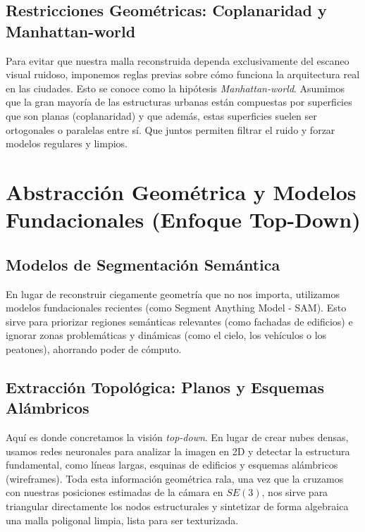 
\subsection{Restricciones Geométricas: Coplanaridad y Manhattan-world}
Para evitar que nuestra malla reconstruida dependa exclusivamente del escaneo visual ruidoso, imponemos reglas previas sobre cómo funciona la arquitectura real en las ciudades. Esto se conoce como la hipótesis \textit{Manhattan-world}. Asumimos que la gran mayoría de las estructuras urbanas están compuestas por superficies que son planas (coplanaridad) y que además, estas superficies suelen ser ortogonales o paralelas entre sí. Que juntos permiten filtrar el ruido y forzar modelos regulares y limpios.


\section{Abstracción Geométrica y Modelos Fundacionales (Enfoque Top-Down)}

\subsection{Modelos de Segmentación Semántica}
En lugar de reconstruir ciegamente geometría que no nos importa, utilizamos modelos fundacionales recientes (como Segment Anything Model - SAM). Esto sirve para priorizar regiones semánticas relevantes (como fachadas de edificios) e ignorar zonas problemáticas y dinámicas (como el cielo, los vehículos o los peatones), ahorrando poder de cómputo.


\subsection{Extracción Topológica: Planos y Esquemas Alámbricos}
Aquí es donde concretamos la visión \textit{top-down}. En lugar de crear nubes densas, usamos redes neuronales para analizar la imagen en 2D y detectar la estructura fundamental, como líneas largas, esquinas de edificios y esquemas alámbricos (wireframes). Toda esta información geométrica rala, una vez que la cruzamos con nuestras posiciones estimadas de la cámara en $SE(3)$, nos sirve para triangular directamente los nodos estructurales y sintetizar de forma algebraica una malla poligonal limpia, lista para ser texturizada.

